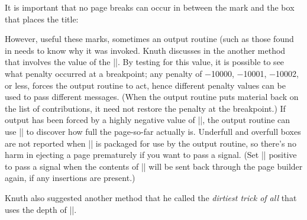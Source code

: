 It is important that no page breaks can occur in between the mark and the
box that places the title:

\begin{teX}
\def\section#1{ ...
   \penalty\beforesectionpenalty
   \mark{#1}
   \hbox{ ... #1 ...}
   \nobreak
   \vskip\aftersectionskip
   \noindent}
\end{teX}

\newdimen\theight 
\def \TeXref#1{%
             \vadjust{\setbox0=\hbox{\sevenrm\quad\quad\TeX book: #1}%
             \theight=\ht0 
             \advance\theight by \dp0    \advance\theight by \lineskip 
             \kern -\theight \vbox to \theight{\rightline{\rlap{\box0}}%
             \vss}%
             }}%
 
However, useful these marks, sometimes an output routine (such as those found in \latexe needs to know why it was invoked. Knuth discusses in the \TeXref{396}  another method
that involves the value of the |\outputpenalty|. 
By testing for this value, it is possible to see what penalty occurred at a breakpoint;
any penalty of −10000, −10001, −10002, or less, forces the output routine to
act, hence different penalty values can be used to pass different messages. (When
the output routine puts material back on the list of contributions, it need not restore
the penalty at the breakpoint.) If output has been forced by a highly negative value
of |\outputpenalty|, the output routine can use |\vbox{}| to discover how
full the page-so-far actually is. Underfull and overfull boxes are not reported when
|| is packaged for use by the output routine, so there’s no harm in ejecting a
page prematurely if you want to pass a signal. (Set |\holdinginserts| positive to pass
a signal when the contents of || will be sent back through the page builder again,
if any insertions are present.)

Knuth also suggested another method that he called the \emph{dirtiest trick of all} that uses the depth 
of ||. 

